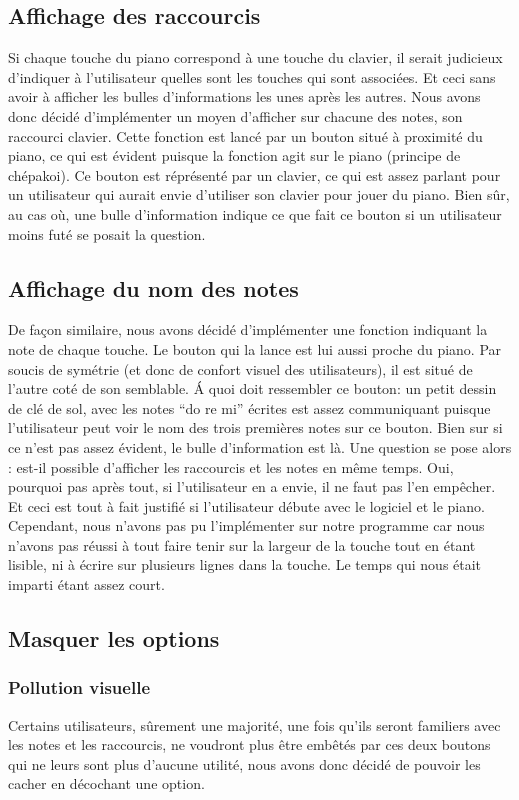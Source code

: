\documentclass{article}
\begin{document}
\subsection{Affichage des raccourcis}
Si chaque touche du piano correspond à une touche du clavier, il serait judicieux d'indiquer à l'utilisateur quelles sont les touches
qui sont associées. Et ceci sans avoir à afficher les bulles d'informations les unes après les autres. Nous avons donc décidé d'implémenter
un moyen d'afficher sur chacune des notes, son raccourci clavier. Cette fonction est lancé par un bouton situé à proximité du piano, ce qui
est évident puisque la fonction agit sur le piano (principe de chépakoi).
Ce bouton est réprésenté par un clavier, ce qui est assez parlant pour un utilisateur qui aurait envie d'utiliser son clavier 
pour jouer du piano.
Bien sûr, au cas où, une bulle d'information indique ce que fait ce bouton si un utilisateur moins futé se posait la question.
\subsection{Affichage du nom des notes}
De façon similaire, nous avons décidé d'implémenter une fonction indiquant la note de chaque touche. Le bouton qui la lance est lui 
aussi proche du piano. Par soucis de symétrie (et donc de confort visuel des utilisateurs), il est situé de l'autre coté de son semblable.
\'A quoi doit ressembler ce bouton: un petit dessin de clé de sol, avec les notes ``do re mi'' écrites est assez communiquant puisque
l'utilisateur peut voir le nom des trois premières notes sur ce bouton. Bien sur si ce n'est pas assez évident, le bulle d'information
est là.
Une question se pose alors : est-il possible d'afficher les raccourcis et les notes en même temps.
Oui, pourquoi pas après tout, si l'utilisateur en a envie, il ne faut pas l'en empêcher. Et ceci est tout à fait justifié si 
l'utilisateur débute avec le logiciel et le piano.
Cependant, nous n'avons pas pu l'implémenter sur notre programme car nous n'avons pas réussi à tout faire tenir sur la largeur de la touche
tout en étant lisible, ni à écrire sur plusieurs lignes dans la touche. Le temps qui nous était imparti étant assez court.
\subsection{Masquer les options}
\subsubsection{Pollution visuelle}
Certains utilisateurs, sûrement une majorité, une fois qu'ils seront familiers avec les notes et les raccourcis, ne voudront plus 
être embêtés par ces deux boutons qui ne leurs sont plus d'aucune utilité, nous avons donc décidé de pouvoir les cacher en décochant
une option.
\end{document}
